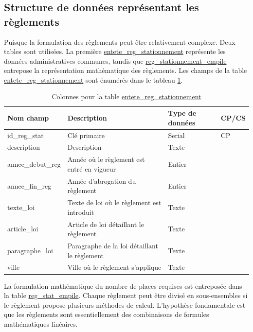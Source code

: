     \subsection{Structure de données représentant les règlements} 
        Puisque la formulation des règlements peut être relativement complexe. Deux tables sont utilisées. La première \underline{entete\_reg\_stationnement} représente les données administratives communes, tandis que \underline{reg\_stationnement\_empile} entrepose la représentation mathématique des règlements. Les champs de la table \underline{entete\_reg\_stationnement} sont énumérés dans le tableau \ref{tab:definition_entete_reg_stationnement}.  \par
        \begin{table}[h]
            \centering
            \begin{tabular}{m{}|m{}m{}m{}}
                \hline
                Nom champ & Description & Type de données & CP/CS  \\
                \hline
                id\_reg\_stat & Clé primaire  & Serial & CP \\ 
                description & Description & Texte & \\ 
                annee\_debut\_reg & Année où le règlement est entré en vigueur & Entier & \\ 
                annee\_fin\_reg & Année d'abrogation du règlement & Entier & \\ 
                texte\_loi & Texte de loi où le règlement est introduit & Texte & \\
                article\_loi & Article de loi détaillant le règlement & Texte & \\
                paragraphe\_loi &  Paragraphe de la loi détaillant le règlement & Texte & \\ 
                ville & Ville où le règlement s'applique & Texte & \\
                
                \hline
            \end{tabular}
            \caption{Colonnes pour la table \underline{entete\_reg\_stationnement}}
            \label{tab:definition_entete_reg_stationnement}
        \end{table}
        La formulation mathématique du nombre de places requises est entreposée dans la table \underline{reg\_stat\_empile}. Chaque règlement peut être divisé en sous-ensembles si le règlement propose plusieurs méthodes de calcul. L'hypothèse fondamentale est que les règlements sont essentiellement des combinaisons de formules mathématiques linéaires.\par
